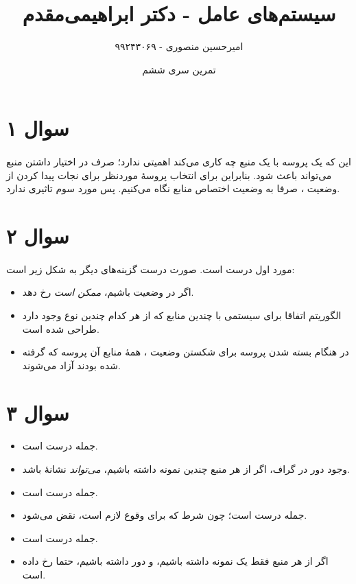 \documentclass{article}
\title{سیستم‌های عامل - دکتر ابراهیمی‌مقدم}
\author{امیرحسین منصوری - ۹۹۲۴۳۰۶۹}
\date{تمرین سری ششم}
\begin{document}
	\maketitle

	\section*{سوال ۱}
	\paragraph*{}
	این که یک پروسه با یک منبع چه کاری می‌کند اهمیتی ندارد؛ صرف در اختیار داشتن منبع می‌تواند باعث
	شود. بنابراین برای انتخاب پروسهٔ موردنظر برای نجات پیدا کردن از وضعیت
	،
	صرفا به وضعیت اختصاص منابع نگاه می‌کنیم. پس مورد سوم تاثیری ندارد.

	\section*{سوال ۲}
	\paragraph*{}
	مورد اول درست است. صورت درست گزینه‌های دیگر به شکل زیر است:

	\begin{itemize}
		\item
		اگر در وضعیت
		باشیم،
		\textit{ممکن است}
		رخ دهد.

		\item
		الگوریتم
		اتفاقا برای سیستمی با چندین منابع که از هر کدام چندین نوع وجود دارد طراحی شده است.

		\item
		در هنگام بسته شدن پروسه برای شکستن وضعیت
		،
		همهٔ منابع آن پروسه که گرفته شده بودند آزاد می‌شوند.
	\end{itemize}

	\section*{سوال ۳}
	\paragraph*{}
	\begin{itemize}
		\item
		جمله درست است.

		\item
		وجود دور در گراف، اگر از هر منبع چندین نمونه داشته باشیم،
		\textit{می‌تواند}
		نشانهٔ
		باشد.

		\item
		جمله درست است.

		\item
		جمله درست است؛ چون شرط
		که برای وقوع
		لازم است، نقض می‌شود.

		\item
		جمله درست است.

		\item
		اگر از هر منبع فقط یک نمونه داشته باشیم، و دور داشته باشیم، حتما
		رخ داده است.
	\end{itemize}
\end{document}
